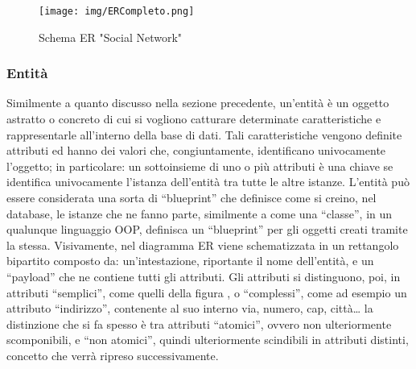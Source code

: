 \documentclass[a4paper,12pt]{report}
\begin{document}
\begin{figure}[h]
    \centering
    \texttt{[image: img/ERCompleto.png]}
    \caption{Schema ER "Social Network"}
\end{figure}

\subsubsection{Entità}
Similmente a quanto discusso nella sezione precedente, un’entità è un oggetto astratto o concreto di cui si vogliono catturare determinate caratteristiche e rappresentarle all’interno della base di dati. Tali caratteristiche vengono definite attributi ed hanno dei valori che, congiuntamente, identificano univocamente l’oggetto; in particolare: un sottoinsieme di uno o più attributi è una chiave se identifica univocamente l’istanza dell’entità tra tutte le altre istanze. L’entità può essere considerata una sorta di “blueprint” che definisce come si creino, nel database, le istanze che ne fanno parte, similmente a come una “classe”, in un qualunque linguaggio OOP, definisca un “blueprint” per gli oggetti creati tramite la stessa. Visivamente, nel diagramma ER viene schematizzata in un rettangolo bipartito composto da: un’intestazione, riportante il nome dell’entità, e un “payload” che ne contiene tutti gli attributi. Gli attributi si distinguono, poi, in attributi “semplici”, come quelli della figura , o “complessi”, come ad esempio un attributo “indirizzo”, contenente al suo interno via, numero, cap, città… la distinzione che si fa spesso è tra attributi “atomici”, ovvero non ulteriormente scomponibili, e “non atomici”, quindi ulteriormente scindibili in attributi distinti, concetto che verrà ripreso successivamente.
\end{document}
